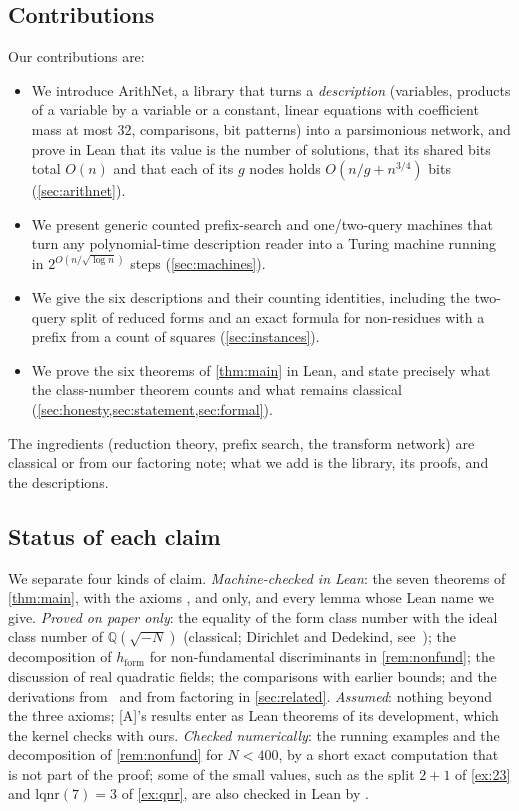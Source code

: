 \documentclass[10pt]{amsart}
\theoremstyle{plain}
\theoremstyle{definition}
\theoremstyle{remark}
\numberwithin{equation}{section}
\newcommand{\A}{\textup{[A]}}
\newcommand{\hF}{h_{\mathrm{form}}}
\newcommand{\rate}{2^{O(n/\sqrt{\log n})}}
\begin{document}
\subsection{Contributions}
Our contributions are:
\begin{itemize}
\item We introduce ArithNet, a library that turns a \emph{description} (variables, products of a variable
by a variable or a constant, linear equations with coefficient mass at most $32$, comparisons, bit
patterns) into a parsimonious network, and prove in Lean that its value is the number of solutions,
that its shared bits total $O(n)$ and that each of its $g$ nodes holds $O(n/g+n^{3/4})$ bits
(\cref{sec:arithnet}).
\item We present generic counted prefix-search and one/two-query machines that turn any polynomial-time
description reader into a Turing machine running in $\rate$ steps (\cref{sec:machines}).
\item We give the six descriptions and their counting identities, including the two-query split of
reduced forms and an exact formula for non-residues with a prefix from a count of squares
(\cref{sec:instances}).
\item We prove the six theorems of \cref{thm:main} in Lean, and state precisely what the class-number
theorem counts and what remains classical (\cref{sec:honesty,sec:statement,sec:formal}).
\end{itemize}
The ingredients (reduction theory, prefix search, the transform network) are classical or from our
factoring note; what we add is the library, its proofs, and the descriptions.

\subsection{Status of each claim}
We separate four kinds of claim. \emph{Machine-checked in Lean}: the seven theorems of \cref{thm:main},
with the axioms ,  and  only, and every lemma whose
Lean name we give. \emph{Proved on paper only}: the equality of the form class number with the ideal class
number of $\mathbb{Q}(\sqrt{-N})$ (classical; Dirichlet and Dedekind, see~\cite[Thm.~7.7]{Cox13}); the
decomposition of $\hF$ for non-fundamental discriminants in \cref{rem:nonfund}; the discussion of real
quadratic fields; the comparisons with earlier bounds; and the derivations from~\cite{OAI003,OAI142} and
from factoring in \cref{sec:related}. \emph{Assumed}: nothing beyond the three axioms;
\A's results enter as Lean theorems of its development, which the kernel checks with ours.
\emph{Checked numerically}: the running examples and the decomposition of \cref{rem:nonfund} for $N<400$, by
a short exact computation that is not part of the proof; some of the small values, such as the split
$2+1$ of \cref{ex:23} and $\mathrm{lqnr}(7)=3$ of \cref{ex:qnr}, are also checked in Lean by .
\end{document}
